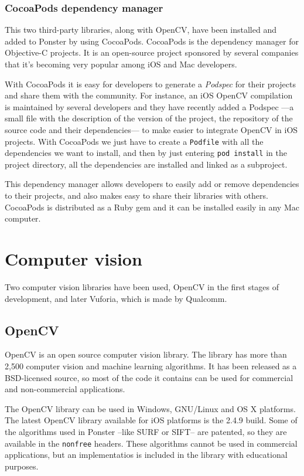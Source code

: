 \subsubsection{CocoaPods dependency manager}
This two third-party libraries, along with OpenCV, have been installed and added to
Ponster by using CocoaPods. CocoaPods is the dependency manager for Objective-C
projects\cite{cocoapods}. It is an open-source project sponsored by several
companies that it's becoming very popular among iOS and Mac developers.

With CocoaPods it is easy for developers to generate a \emph{Podspec} for their
projects and share them with the community. For instance, an iOS OpenCV compilation
is maintained by several developers and they have recently added a Podspec ---a small
file with the description of the version of the project, the repository of the
source code and their dependencies--- to make easier to integrate OpenCV in iOS
projects. With CocoaPods we just have to create a \texttt{Podfile} with all the
dependencies we want to install, and then by just entering \texttt{pod install} in
the project directory, all the dependencies are installed and linked as a
subproject.

This dependency manager allows developers to easily add or remove dependencies to
their projects, and also makes easy to share their libraries with others. CocoaPods
is distributed as a Ruby gem and it can be installed easily in any Mac computer.

\section{Computer vision}
Two computer vision libraries have been used, OpenCV in the first stages of
development, and later Vuforia, which is made by Qualcomm. 

\subsection{OpenCV}
OpenCV is an open source computer vision library\cite{opencv}. The library has
more than 2,500 computer vision and machine learning algorithms. It has been
released as a BSD-licensed source, so most of the code it contains can be used for
commercial and non-commercial applications.

The OpenCV library can be used in Windows, GNU/Linux and OS X platforms. The
latest OpenCV library available for iOS platforms is the 2.4.9
build\cite{opencvpod}. Some of the algorithms used in Ponster --like SURF or SIFT--
are patented, so they are available in the \texttt{nonfree} headers. These
algorithms cannot be used in commercial applications, but an implementatios is
included in the library with educational purposes. 

